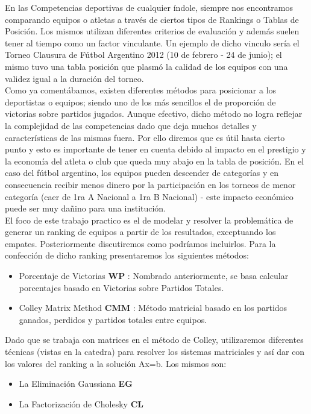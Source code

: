 

En las Competencias deportivas de cualquier índole, siempre nos encontramos comparando equipos o atletas a través de ciertos tipos de Rankings o Tablas de Posición. Los mismos utilizan diferentes criterios de evaluación y además suelen tener al tiempo como un factor vinculante. Un ejemplo de dicho vinculo sería el Torneo Clausura de Fútbol Argentino 2012 (10 de febrero - 24 de junio); el mismo tuvo una tabla posición que plasmó la calidad de los equipos con una validez igual a la duración del torneo.\\
Como ya comentábamos, existen diferentes métodos para posicionar a los deportistas o equipos; siendo uno de los más sencillos el de proporción de victorias sobre partidos jugados. Aunque efectivo, dicho método no logra reflejar la complejidad de las competencias dado que deja muchos detalles y características de las mismas fuera. Por ello diremos que es útil hasta cierto punto y esto es importante de tener en cuenta debido al impacto en el prestigio y la economía del atleta o club que queda muy abajo en la tabla de posición. En el caso del fútbol argentino, los equipos pueden descender de categorías y en consecuencia recibir menos dinero por la participación en los torneos de menor categoría (caer de 1ra A Nacional a 1ra B Nacional) - este impacto económico puede ser muy dañino para una institución.\\

El foco de este trabajo practico es el de modelar y resolver la problemática de generar un ranking de equipos a partir de los resultados, exceptuando los empates. Posteriormente discutiremos como podríamos incluirlos.
Para la confección de dicho ranking presentaremos los siguientes métodos:
\begin{itemize}  
\item Porcentaje de Victorias \textbf{WP} : Nombrado anteriormente, se basa calcular porcentajes basado en Victorias sobre Partidos Totales.
\item Colley Matrix Method \textbf{CMM} : Método matricial basado en los partidos ganados, perdidos y partidos totales entre equipos.
\end{itemize}

Dado que se trabaja con matrices en el método de Colley, utilizaremos diferentes técnicas (vistas en la catedra) para resolver los sistemas matriciales y así dar con los valores del ranking a la solución Ax=b.  Los mismos son:

\begin{itemize}  
\item La Eliminación Gaussiana \textbf{EG}
\item La Factorización de Cholesky \textbf{CL}
\end{itemize}


